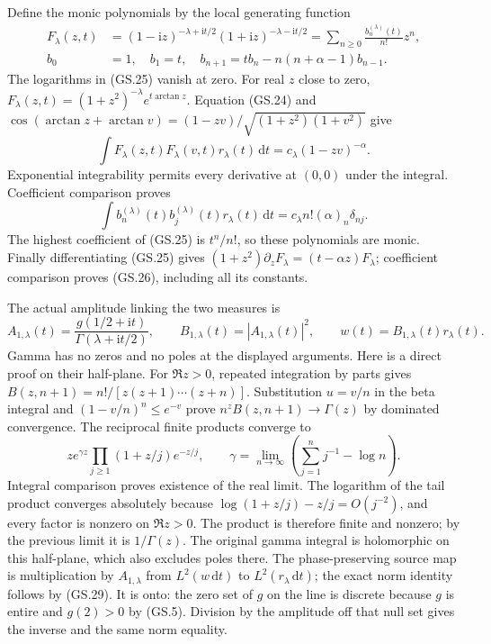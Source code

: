 \documentclass[11pt]{article}
\newcommand{\ii}{\mathrm i}
\newcommand{\dd}{\,\mathrm d}
\begin{document}
Define the monic polynomials by the local generating function
\begin{align}
 F_\lambda(z,t)&=(1-\ii z)^{-\lambda+\ii t/2}
                 (1+\ii z)^{-\lambda-\ii t/2}
 =\sum_{n\ge0}\frac{b_n^{(\lambda)}(t)}{n!}z^n,\tag{GS.25}\\
 b_0&=1,\quad b_1=t,\quad
 b_{n+1}=t b_n-n(n+\alpha-1)b_{n-1}.\tag{GS.26}
\end{align}
The logarithms in (GS.25) vanish at zero. For real $z$ close to
zero, $F_\lambda(z,t)=(1+z^2)^{-\lambda}e^{t\arctan z}$.
Equation (GS.24) and
$\cos(\arctan z+\arctan v)=(1-zv)/\sqrt{(1+z^2)(1+v^2)}$
give
\begin{equation}
 \int F_\lambda(z,t)F_\lambda(v,t)r_\lambda(t)\dd t
 =c_\lambda(1-zv)^{-\alpha}.\tag{GS.27}
\end{equation}
Exponential integrability permits every derivative at $(0,0)$
under the integral. Coefficient comparison proves
\begin{equation}
 \int b_n^{(\lambda)}(t)b_j^{(\lambda)}(t)r_\lambda(t)\dd t
 =c_\lambda n!(\alpha)_n\delta_{nj}.\tag{GS.28}
\end{equation}
The highest coefficient of (GS.25) is $t^n/n!$, so these
polynomials are monic. Finally differentiating (GS.25) gives
$(1+z^2)\partial_zF_\lambda=(t-\alpha z)F_\lambda$;
coefficient comparison proves (GS.26), including all its constants.

The actual amplitude linking the two measures is
\begin{equation}
 A_{1,\lambda}(t)=\frac{g(1/2+\ii t)}{\Gamma(\lambda+\ii t/2)},
 \qquad B_{1,\lambda}(t)=|A_{1,\lambda}(t)|^2,
 \qquad w(t)=B_{1,\lambda}(t)r_\lambda(t).\tag{GS.29}
\end{equation}
Gamma has no zeros and no poles at the displayed arguments. Here is
a direct proof on their half-plane. For $\Re z>0$, repeated integration
by parts gives $B(z,n+1)=n!/[z(z+1)\cdots(z+n)]$.
Substitution $u=v/n$ in the beta integral and
$(1-v/n)^n\le e^{-v}$ prove $n^z B(z,n+1)\to\Gamma(z)$ by
dominated convergence. The reciprocal finite products converge to
\[
 z e^{\gamma z}\prod_{j\ge1}(1+z/j)e^{-z/j},\qquad
 \gamma=\lim_{n\to\infty}\left(\sum_{j=1}^n j^{-1}-\log n\right).
\]
Integral comparison proves existence of the real limit. The logarithm
of the tail product converges absolutely because
$\log(1+z/j)-z/j=O(j^{-2})$, and every factor is nonzero on
$\Re z>0$. The product is therefore finite and nonzero; by the
previous limit it is $1/\Gamma(z)$. The original gamma integral is
holomorphic on this half-plane, which also excludes poles there.
The phase-preserving source map is multiplication by $A_{1,\lambda}$
from $L^2(w\dd t)$ to $L^2(r_\lambda\dd t)$; the exact norm
identity follows by (GS.29). It is onto: the zero set of $g$ on
the line is discrete because $g$ is entire and $g(2)>0$ by (GS.5).
Division by the amplitude off that null set gives the inverse and
the same norm equality.
\end{document}
